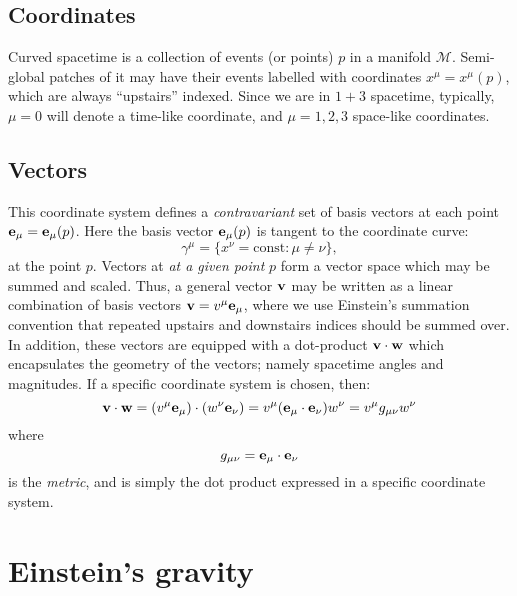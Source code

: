 \subsection{Coordinates}
Curved spacetime is a collection of events (or points) $p$ in a manifold $\mathcal{M}$. Semi-global patches of it may have their events labelled with coordinates $x^\mu = x^\mu(p)$, which are always ``upstairs'' indexed. Since we are in $1+3$ spacetime, typically, $\mu=0$ will denote a time-like coordinate, and $\mu=1,2,3$ space-like coordinates.

\subsection{Vectors}
This coordinate system defines a {\em contravariant\/} set of basis vectors at each point $\mathbf{e}_\mu = \mathbf{e}_\mu(p)$. Here the basis vector $\mathbf{e}_\mu(p)$ is tangent to the coordinate curve:
\begin{equation}
  \gamma^\mu = \{x^\nu=\mathrm{const} : \mu\ne\nu\},
  \label{eqn:cos:coordinate_curve}
\end{equation}
at the point $p$.  Vectors at {\em at a given point\/} $p$ form a vector space which may be summed and scaled. Thus, a general vector $\mathbf{v}$ may be written as a linear combination of basis vectors $\mathbf{v} = v^\mu \mathbf{e}_\mu$, where we use Einstein's summation convention that repeated upstairs and downstairs indices should be summed over. In addition, these vectors are equipped with a dot-product $\mathbf{v}\cdot\mathbf{w}$ which encapsulates the geometry of the vectors; namely spacetime angles and magnitudes. If a specific coordinate system is chosen, then:
\begin{equation}
  \mathbf{v}\cdot\mathbf{w} = (v^\mu\mathbf{e}_\mu)\cdot(w^\nu\mathbf{e}_\nu) = v^\mu (\mathbf{e}_\mu\cdot\mathbf{e}_\nu)w^\nu =  v^\mu g_{\mu\nu} w^\nu
  \label{eqn:cos:dot_product}
\end{equation}
where 
\begin{equation}
  g_{\mu\nu} = \mathbf{e}_\mu\cdot\mathbf{e}_\nu
  \label{eqn:cos:metric_def}
\end{equation}
is the {\em metric}, and is simply the dot product expressed in a specific coordinate system.



\section{Einstein's gravity}
\label{sec:cos:einsteins_gravity}

